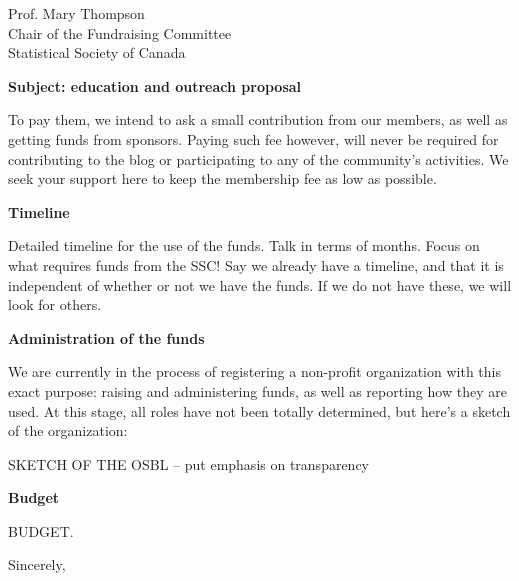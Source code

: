 \documentclass[11pt, a4paper]{letter} %
\begin{document}
\begin{letter}{
	Prof. Mary Thompson\\
	Chair of the Fundraising Committee\\
	Statistical Society of Canada
	
	\bigskip
	\textbf{Subject: education and outreach proposal}%
}
To pay them, we intend to ask a small contribution from our members, as well as getting funds from sponsors. Paying such fee however, will never be required for contributing to the blog or participating to any of the community's activities. We seek your support here to keep the membership fee as low as possible.


\noindent \textbf{Timeline}

Detailed timeline for the use of the funds. Talk in terms of months. Focus on what requires funds from the SSC! Say we already have a timeline, and that it is independent of whether or not we have the funds. If we do not have these, we will look for others.


\noindent \textbf{Administration of the funds}

We are currently in the process of registering a non-profit organization with this exact purpose: raising and administering funds, as well as reporting how they are used. At this stage, all roles have not been totally determined, but here's a sketch of the organization:

SKETCH OF THE OSBL -- put emphasis on transparency


\noindent \textbf{Budget}

BUDGET.



%
      
\closing{Sincerely,}




\end{letter}
\end{document}
